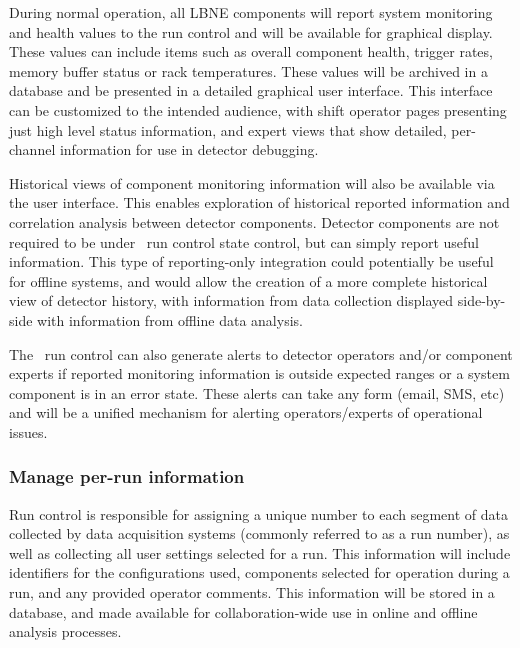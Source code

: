 During normal operation, all LBNE components will report system
monitoring and health values to the run control and will be
available for graphical display.  These values can include items such
as overall component health, trigger rates, memory buffer status or
rack temperatures.  These values will be archived in a database and be
presented in a detailed graphical user interface.  This interface can
be customized to the intended audience, with shift operator pages
presenting just high level status information, and expert views that
show detailed, per-channel information for use in detector debugging.

Historical views of component monitoring information will also be
available via the user interface.  This enables exploration of
historical reported information and correlation analysis between
detector components.  Detector components are not required to be under
\LBNE\ run control state control, but can simply report useful
information.  This type of reporting-only integration could
potentially be useful for offline systems, and would allow the
creation of a more complete historical view of detector history, with
information from data collection displayed side-by-side with
information from offline data analysis.

The \LBNE\ run control can also generate alerts to detector
operators and/or component experts if reported monitoring information
is outside expected ranges or a system component is in an error state.
These alerts can take any form (email, SMS, etc) and will be a unified
mechanism for alerting operators/experts of operational issues.

\subsubsection{Manage per-run information}

Run control is responsible for assigning a
unique number to each segment of data collected by data acquisition
systems (commonly referred to as a run number), as well as collecting
all user settings selected for a run.  This information will include
identifiers for the configurations used, components selected for operation
during a run, and any provided operator comments.  This information
will be stored in a database, and made available for
collaboration-wide use in online and offline analysis processes.

